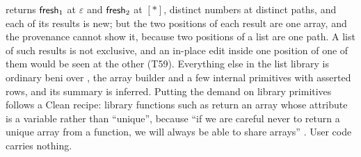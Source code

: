  returns $\mathsf{fresh}_1$ at $\varepsilon$ and $\mathsf{fresh}_2$ at
$[\ast]$, distinct numbers at distinct paths, and each of its results is new; but the two positions of
each result are one array, and the provenance cannot show it, because two positions of a list are one
path. A list of such results is not exclusive, and an in-place edit inside one position of one of them
would be seen at the other (T59). Everything else in the list library is ordinary beni over
, the array builder and a few internal primitives with asserted rows, and its summary is
inferred. Putting the demand on library primitives follows a Clean recipe: library functions such as
 return an array whose attribute is a variable rather than ``unique'', because ``if we are
careful never to return a unique array from a function, we will always be able to share arrays''
\citep[\S6]{devries2008simplified}. User code carries nothing.

